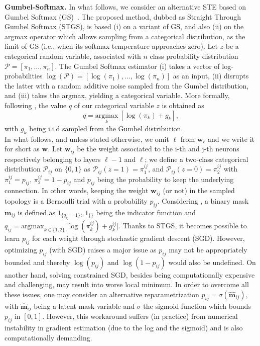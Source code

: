 \noindent\textbf{Gumbel-Softmax.} In what follows, we consider an alternative
STE based on Gumbel Softmax (GS)~\cite{DBLP:conf/iclr/JangGP17}. The proposed
method, dubbed as Straight Through Gumbel Softmax (STGS), is based (i) on a
variant of GS, and also (ii) on the argmax operator which allows sampling from
a categorical distribution, as the limit of GS (i.e., when its softmax temperature
approaches zero).  Let $z$ be a categorical random variable, associated with $n$
class probability distribution $\mathcal{P} = [\pi_1,\dots,\pi_n]$. The Gumbel
Softmax estimator (i) takes a vector of log-probabilities $\log(\mathcal{P})
=[\log(\pi_1),\dots, \log(\pi_n)]$ as an input, (ii) disrupts the latter with
a random additive noise sampled from the Gumbel distribution, and (iii) takes
the argmax, yielding a categorical variable. More formally, following
\cite{DBLP:conf/iclr/JangGP17}, the value $q$ of our categorical variable $z$
is obtained as 
\begin{equation}
  \label{eq:gumbel-softmax-argmax}
  q = \underset{k}{ \text{argmax}} \ [ \log(\pi_k)+g_k ],
\end{equation}
with $g_k$ being i.i.d sampled from  the Gumbel distribution.\\
\noindent In what follows, and unless stated otherwise, we omit $\ell$ from
$\bm{w}_\ell$ and we write it for short as $\bm{w}$. Let $\bm{w}_{ij}$ be the
weight associated to the i-th and j-th neurons  respectively belonging to
layers $\ell-1$ and $\ell$; we define a two-class categorical
distribution $\mathcal{P}_{ij}$ on $\{0,1\}$ as
$\mathcal{P}_{ij}(z=1)=\pi_1^{ij}$, and $\mathcal{P}_{ij}(z=0)=\pi_2^{ij}$
with $\pi_1^{ij}=p_{ij}$, $\pi_2^{ij}=1-p_{ij}$ and $p_{ij}$ being the
probability to keep the underlying connection. In other words, keeping the
weight $\bm{w}_{ij}$ (or not) in the sampled topology is a Bernoulli trial
with a probability $p_{ij}$. Considering
, a binary mask  $\bm{m}_{ij}$ is defined as
$1_{\{q_{ij}=1\}}$, $1_{\{\}}$ being the indicator function and $q_{ij} =
{\text{argmax}_{k \in \{1,2\}}}\big[\log(\pi_k^{ij})+g_k^{ij}\big]$.
\noindent Thanks to STGS, it becomes possible to learn $p_{ij}$ for each
weight through stochastic gradient descent (SGD). However, optimizing $p_{ij}$
(with SGD) raises a major issue as $p_{ij}$ may not be appropriately bounded
and thereby $\log(p_{ij})$ and $\log(1-p_{ij})$ would also be undefined.  On
another hand,  solving constrained SGD, besides being computationally
expensive and challenging, may result into worse local minimum. In order to
overcome all these issues, one may consider an alternative
reparametrization $p_{ij}=\sigma(\bm{\hat{m}}_{ij})$, with $\bm{\hat{m}}_{ij}$
being a latent mask variable and $\sigma$ the sigmoid function which bounds
$p_{ij}$ in $[0,1]$. However, this workaround suffers (in practice) from
numerical instability in gradient estimation (due to the log and the sigmoid)
and is also computationally demanding. \\

